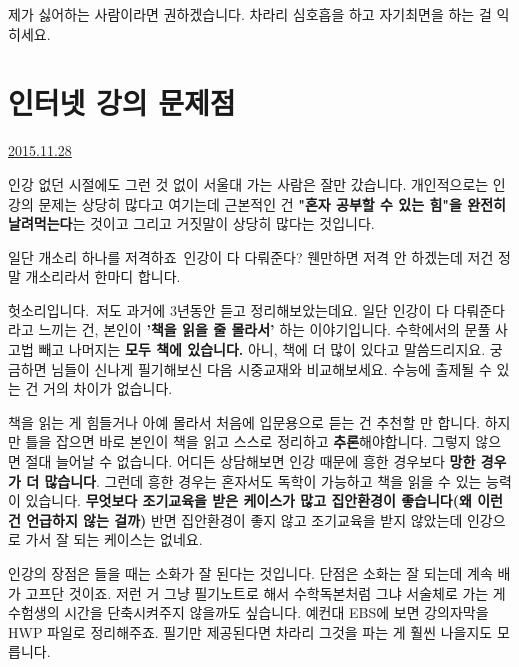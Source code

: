 제가 싫어하는 사람이라면 권하겠습니다.
차라리 심호흡을 하고 자기최면을 하는 걸 익히세요.
\vspace{5mm}





\section{인터넷 강의 문제점}
\href{https://www.kockoc.com/Apoc/514702}{2015.11.28}

\vspace{5mm}

인강 없던 시절에도 그런 것 없이 서울대 가는 사람은 잘만 갔습니다.
개인적으로는 인강의 문제는 상당히 많다고 여기는데
근본적인 건 \textbf{"혼자 공부할 수 있는 힘"을 완전히 날려먹는다}는 것이고
그리고 거짓말이 상당히 많다는 것입니다.
\vspace{5mm}

일단 개소리 하나를 저격하죠 인강이 다 다뤄준다?
웬만하면 저격 안 하겠는데 저건 정말 개소리라서 한마디 합니다.
\vspace{5mm}

헛소리입니다. 저도 과거에 3년동안 듣고 정리해보았는데요.
일단 인강이 다 다뤄준다라고 느끼는 건, 본인이 \textbf{'책을 읽을 줄 몰라서'} 하는 이야기입니다.
수학에서의 문풀 사고법 빼고 나머지는 \textbf{모두 책에 있습니다.} 아니, 책에 더 많이 있다고 말씀드리지요.
궁금하면 님들이 신나게 필기해보신 다음 시중교재와 비교해보세요. 수능에 출제될 수 있는 건 거의 차이가 없습니다.
\vspace{5mm}

책을 읽는 게 힘들거나 아예 몰라서 처음에 입문용으로 듣는 건 추천할 만 합니다.
하지만 틀을 잡으면 바로 본인이 책을 읽고 스스로 정리하고 \textbf{추론}해야합니다. 그렇지 않으면 절대 늘어날 수 없습니다.
어디든 상담해보면 인강 때문에 흥한 경우보다 \textbf{망한 경우가 더 많습니다}.
그런데 흥한 경우는 혼자서도 독학이 가능하고 책을 읽을 수 있는 능력이 있습니다.
\textbf{무엇보다 조기교육을 받은 케이스가 많고 집안환경이 좋습니다(왜 이런 건 언급하지 않는 걸까)}
반면 집안환경이 좋지 않고 조기교육을 받지 않았는데 인강으로 가서 잘 되는 케이스는 없네요.
\vspace{5mm}

인강의 장점은 들을 때는 소화가 잘 된다는 것입니다. 단점은 소화는 잘 되는데 계속 배가 고프단 것이죠.
저런 거 그냥 필기노트로 해서 수학독본처럼 그냐 서술체로 가는 게 수험생의 시간을 단축시켜주지 않을까도 싶습니다.
예컨대 EBS에 보면 강의자막을 HWP 파일로 정리해주죠. 필기만 제공된다면 차라리 그것을 파는 게 훨씬 나을지도 모릅니다.
\vspace{5mm}

